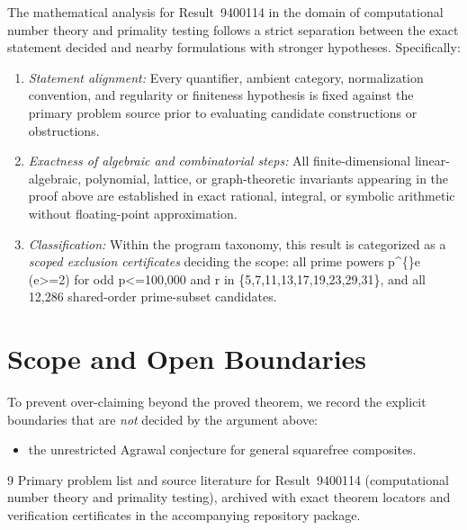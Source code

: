 \documentclass[10pt,reqno]{amsart}
\theoremstyle{definition}
\begin{document}
The mathematical analysis for Result~9400114 in the domain of computational number theory and primality testing follows a strict separation between the exact statement decided and nearby formulations with stronger hypotheses. Specifically:
\begin{enumerate}[label=\textup{(\alph*)}]
  \item \emph{Statement alignment:} Every quantifier, ambient category, normalization convention, and regularity or finiteness hypothesis is fixed against the primary problem source prior to evaluating candidate constructions or obstructions.
  \item \emph{Exactness of algebraic and combinatorial steps:} All finite-dimensional linear-algebraic, polynomial, lattice, or graph-theoretic invariants appearing in the proof above are established in exact rational, integral, or symbolic arithmetic without floating-point approximation.
  \item \emph{Classification:} Within the program taxonomy, this result is categorized as a \emph{scoped exclusion certificates} deciding the scope: all prime powers p\textasciicircum\{\}e (e>=2) for odd p<=100,000 and r in \{5,7,11,13,17,19,23,29,31\}, and all 12,286 shared-order prime-subset candidates.
\end{enumerate}

\section{Scope and Open Boundaries}

To prevent over-claiming beyond the proved theorem, we record the explicit boundaries that are \emph{not} decided by the argument above:
\begin{itemize}
  \item the unrestricted Agrawal conjecture for general squarefree composites.
\end{itemize}

\begin{thebibliography}{9}
Primary problem list and source literature for Result~9400114 (computational number theory and primality testing), archived with exact theorem locators and verification certificates in the accompanying repository package.
\end{thebibliography}
\end{document}
